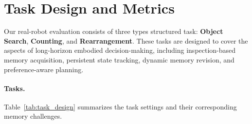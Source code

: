 






\section{Task Design and Metrics}

Our real-robot evaluation consists of three types structured task: \textbf{Object Search}, \textbf{Counting}, and \textbf{Rearrangement}. These tasks are designed to cover the aspects of long-horizon embodied decision-making, including inspection-based memory acquisition, persistent state tracking, dynamic memory revision, and preference-aware planning.

\paragraph{Tasks.}
Table~\ref{tab:task_design} summarizes the task settings and their corresponding memory challenges.

